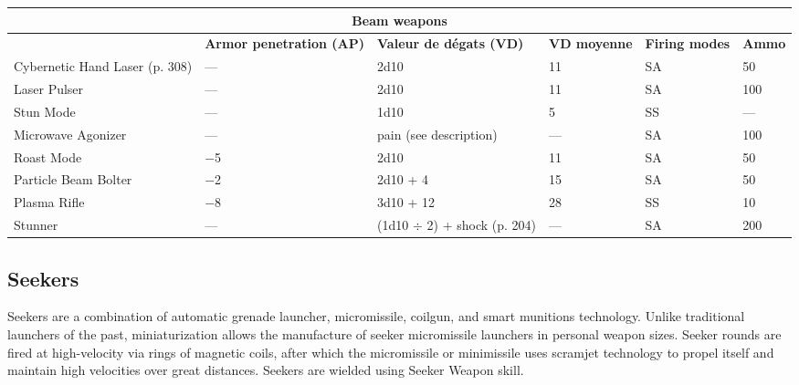 \begin{table} \begin{tabularx}{\textwidth}{|X|X|X|X|l|l|} \hline

\multicolumn{6}{|c|}{\textbf{Beam weapons}} \\ \hline

&\textbf{Armor penetration (AP)}	&\textbf{Valeur de dégats (VD)}	&\textbf{VD moyenne}	&\textbf{Firing modes}	&\textbf{Ammo} \\ \hline

Cybernetic Hand Laser (p. 308)	&--- &2d10	&11	&SA	&50 \\ \hline

Laser Pulser	&--- &2d10	&11	&SA	&100 \\ \hline

Stun Mode	&--- &1d10	&5	&SS	&--- \\ \hline

Microwave Agonizer	&--- &pain (see description)	&--- &SA	&100 \\ \hline

Roast Mode	&$-$5	&2d10	&11	&SA	&50 \\ \hline

Particle Beam Bolter	&$-$2	&2d10 + 4	&15	&SA	&50 \\ \hline

Plasma Rifle	&$-$8	&3d10 + 12	&28	&SS	&10 \\ \hline

Stunner	&--- &(1d10 $\div$ 2) + shock (p. 204)	&--- &SA	&200 \\ \hline

\end{tabularx} \label{tab:beam-weapons} \end{table} 



\subsection{Seekers} \label{sec:seekers} 

Seekers are a combination of automatic grenade launcher, micromissile, coilgun, and smart munitions technology. Unlike traditional launchers of the past, miniaturization allows the manufacture of seeker micromissile launchers in personal weapon sizes. Seeker rounds are fired at high-velocity via rings of magnetic coils, after which the micromissile or minimissile uses scramjet technology to propel itself and maintain high velocities over great distances. Seekers are wielded using Seeker Weapon skill. 

